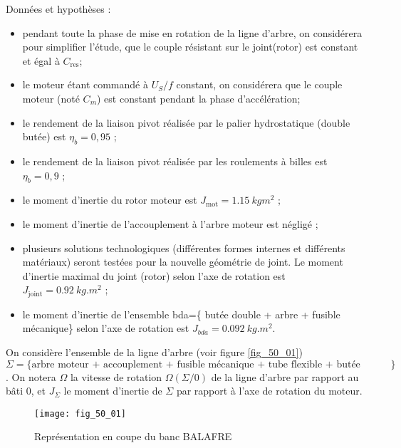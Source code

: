 Données et hypothèses :
\begin{itemize}
\item pendant toute la phase de mise en rotation de la ligne d’arbre, on considérera pour
simplifier l’étude, que le couple résistant sur le joint(rotor) est constant et égal à
$C_{\text{res}}$;
\item le moteur étant commandé à $U_S/f$ constant, on considérera que le couple moteur
(noté $C_m$) est constant pendant la phase d’accélération;
\item le rendement de la liaison pivot réalisée par le palier hydrostatique (double butée)
est $\eta_b = 0,95$ ;
\item le rendement de la liaison pivot réalisée par les roulements à billes est $\eta_b = 0,9$ ;
\item le moment d’inertie du rotor moteur est $J_{\text{mot}} = \SI{1,15}{kgm^2}$ ;
\item le moment d’inertie de l’accouplement à l’arbre moteur est négligé ;
\item plusieurs solutions technologiques (différentes formes internes et différents matériaux)
seront testées pour la nouvelle géométrie de joint. Le moment d’inertie
maximal du joint (rotor) selon l’axe de rotation est $J_{\text{joint}}= \SI{0,92}{kg. m^2}$ ;
\item le moment d’inertie de l’ensemble bda=\{ butée double + arbre + fusible mécanique\} selon l’axe de rotation est $J_{bda} = \SI{0,092}{kg.m^2}$.
\end{itemize}

On considère l’ensemble de la ligne d’arbre (voir figure \autoref{fig_50_01})  $\Sigma=\{ \text{arbre moteur + accouplement
+ fusible mécanique + tube flexible + butée double + Joint (rotor)} \}$.
On notera $\Omega$ la vitesse de rotation $\Omega\left(\Sigma/0\right)$ de la ligne d’arbre par rapport au bâti 0, et
$J_{\Sigma}$  le moment d’inertie de $\Sigma$ par rapport à l’axe de rotation du moteur.

 
\begin{figure}[H]
\centering
\texttt{[image: fig\_50\_01]}
\caption{Représentation en coupe du banc BALAFRE \label{fig_50_01}}
\end{figure}


\fi
 
\ifprof
\else
\fi

\ifprof
\else
\fi

